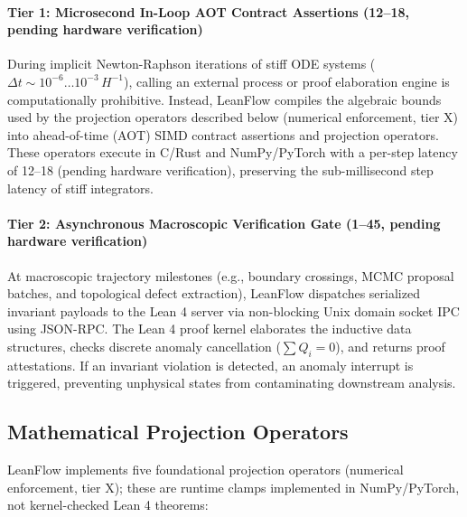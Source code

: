 \documentclass[11pt,a4paper]{article}
\newcommand{\numreconcile}[2]{#1}
\begin{document}
\paragraph{Tier 1: Microsecond In-Loop AOT Contract Assertions (\numreconcile{12--18}{ns}, pending hardware verification)}
During implicit Newton-Raphson iterations of stiff ODE systems ($\Delta t \sim 10^{-6}\dots 10^{-3}\,H^{-1}$), calling an external process or proof elaboration engine is computationally prohibitive. Instead, LeanFlow compiles the algebraic bounds used by the projection operators described below (numerical enforcement, tier X) into ahead-of-time (AOT) SIMD contract assertions and projection operators. These operators execute in C/Rust and NumPy/PyTorch with a per-step latency of \numreconcile{12--18}{ns} (pending hardware verification), preserving the sub-millisecond step latency of stiff integrators.

\paragraph{Tier 2: Asynchronous Macroscopic Verification Gate (\numreconcile{1--45}{ms}, pending hardware verification)}
At macroscopic trajectory milestones (e.g., boundary crossings, MCMC proposal batches, and topological defect extraction), LeanFlow dispatches serialized invariant payloads to the Lean 4 server via non-blocking Unix domain socket IPC using JSON-RPC. The Lean 4 proof kernel elaborates the inductive data structures, checks discrete anomaly cancellation ($\sum Q_i = 0$), and returns proof attestations. If an invariant violation is detected, an anomaly interrupt is triggered, preventing unphysical states from contaminating downstream analysis.

\subsection{Mathematical Projection Operators}
LeanFlow implements five foundational projection operators (numerical enforcement, tier X); these are runtime clamps implemented in NumPy/PyTorch, not kernel-checked Lean 4 theorems:
\end{document}
